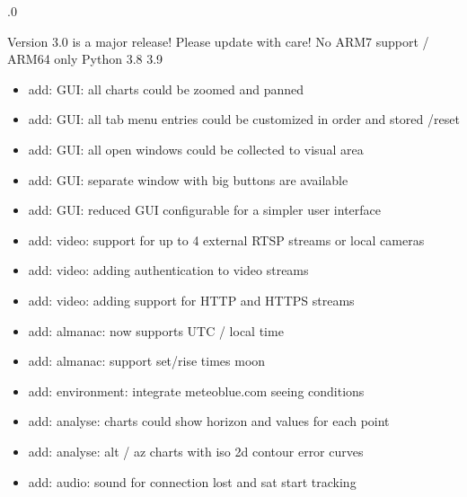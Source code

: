 \documentclass[a4paper,10pt,english]{sphinxmanual}
\begin{document}
.0

\sphinxAtStartPar
Version 3.0 is a major release! Please update with care!
No ARM7 support / ARM64 only Python 3.8 \sphinxhyphen{} 3.9
\begin{itemize}
\item {} 
\sphinxAtStartPar
add: GUI: all charts could be zoomed and panned

\item {} 
\sphinxAtStartPar
add: GUI: all tab menu entries could be customized in order and stored /reset

\item {} 
\sphinxAtStartPar
add: GUI: all open windows could be collected to visual area

\item {} 
\sphinxAtStartPar
add: GUI: separate window with big buttons are available

\item {} 
\sphinxAtStartPar
add: GUI: reduced GUI configurable for a simpler user interface

\item {} 
\sphinxAtStartPar
add: video: support for up to 4 external RTSP streams or local cameras

\item {} 
\sphinxAtStartPar
add: video: adding authentication to video streams

\item {} 
\sphinxAtStartPar
add: video: adding support for HTTP and HTTPS streams

\item {} 
\sphinxAtStartPar
add: almanac: now supports UTC / local time

\item {} 
\sphinxAtStartPar
add: almanac: support set/rise times moon

\item {} 
\sphinxAtStartPar
add: environment: integrate meteoblue.com seeing conditions

\item {} 
\sphinxAtStartPar
add: analyse: charts could show horizon and values for each point

\item {} 
\sphinxAtStartPar
add: analyse: alt / az charts with iso 2d contour error curves

\item {} 
\sphinxAtStartPar
add: audio: sound for connection lost and sat start tracking


\end{itemize}
\end{document}
